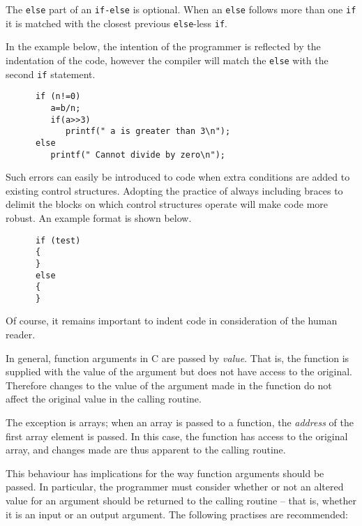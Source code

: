The {\tt else} part of an {\tt if-else} is optional. When an {\tt else}
follows more than one {\tt if} it is matched with the closest previous 
{\tt else}-less {\tt if}.

In the example below, the intention of the programmer is reflected by the 
indentation of the code, however the compiler will match the {\tt else}
with the second {\tt if} statement.
\begin{verbatim}
      if (n!=0)
         a=b/n;
         if(a>>3)
            printf(" a is greater than 3\n");
      else
         printf(" Cannot divide by zero\n");
\end{verbatim}
Such errors can easily be introduced to code when extra conditions are
added to existing control structures.
Adopting the practice of always including braces to delimit the blocks on
which control structures operate will make code more robust.
An example format is shown below.
\begin{verbatim}
      if (test) 
      {
      } 
      else 
      {
      }
\end{verbatim}
Of course, it remains important to indent code in consideration of the 
human reader.



In general, function arguments in C are passed by {\sl value}.
That is, the function is supplied with the value of the argument but does
not have access to the original. Therefore changes to the value of the argument 
made in the function do not affect the original value in the calling 
routine. 

The exception is arrays; when an array is passed to a function, the {\sl 
address\/} of the first array element is passed. In this case, the function 
has access to the original array, and changes made are thus apparent to the
calling routine.

This behaviour has implications for the way function arguments should be
passed. In particular, the programmer must consider whether or not 
an altered value 
for an argument should be returned to the calling routine -- that is, whether
it is an input or an output argument.
The following practises are recommended:

